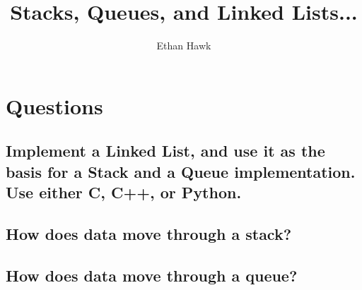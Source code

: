 \documentclass{article}
\title{Stacks, Queues, and Linked Lists...}
\author{Ethan Hawk}
\begin{document}
\maketitle

\section*{Questions}

\subsection{Implement a Linked List, and use it as the basis for a Stack and a Queue implementation. Use either C, C++, or Python.}

\vspace{144pt}

\subsection{How does data move through a stack?}

\vspace{144pt}

\subsection{How does data move through a queue?}

\vspace{144pt}
\end{document}
